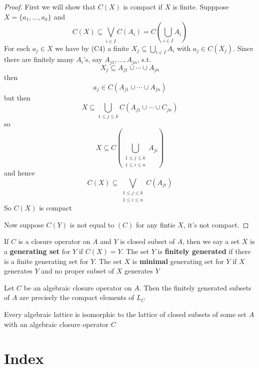 \documentclass[11pt]{article}
\begin{document}
\begin{proof}
First we will show that \(C(X)\) is compact if \(X\) is finite. Supppose 
\(X=\{a_1,\dots,a_k\}\) and
\begin{equation*}
C(X)\subseteq\displaystyle\bigvee_{i\in I}C(A_i)=C(\bigcup_{i\in I}A_i)
\end{equation*}
For each \(a_j\in X\) we have by (C4) a finite 
\(X_j\subseteq \bigcup_{i\in I}A_i\) with \(a_j\in C(X_j)\). Since there are
finitely many \(A_i\)'s, say \(A_{j1},\dots,A_{jn}\), s.t.
\begin{equation*}
X_j\subseteq A_{j1}\cup\cdots\cup A_{jn}
\end{equation*}
then
\begin{equation*}
a_j\in C(A_{j1}\cup\cdots\cup A_{jn})
\end{equation*}
but then
\begin{equation*}
X\subseteq \displaystyle\bigcup_{1\le j\le k}C(A_{j1}\cup\cdots\cup C_{jn})
\end{equation*}
so
\begin{equation*}
X\subseteq C(\displaystyle\bigcup_{\substack{1\le j\le k\\1\le i\le n}}A_{ji})
\end{equation*}
and hence
\begin{equation*}
C(X)\subseteq\displaystyle\bigvee_{\substack{1\le j\le k\\1\le i\le n}}C(A_{ji})
\end{equation*}
So \(C(X)\) is compact

Now suppose \(C(Y)\) is not equal to  \((C)\) for any fintie \(X\), it's not compact.
\end{proof}

\begin{definition}[]
If \(C\) is a closure operator on \(A\) and \(Y\) is closed subset of \(A\), then
we say a set \(X\) is a \textbf{generating set} for \(Y\) if \(C(X)=Y\). The set \(Y\) is 
\textbf{finitely generated} if there is a finite generating set for \(Y\). The set \(X\)
is \textbf{minimal} generating set for \(Y\) if \(X\) generates \(Y\) and no proper subset
of \(X\) generates \(Y\)
\end{definition}


\begin{corollary}[]
Let \(C\) be an algebraic closure operator on \(A\). Then the finitely generated
subsets of \(A\) are precisely the compact elements of \(L_C\)
\end{corollary}

\begin{theorem}[]
Every algebraic lattice is isomorphic to the lattice of closed subsets of
some set \(A\) with an algebraic closure operator \(C\)
\end{theorem}


\section{Index}
\label{sec:orgcf582db}
\renewcommand{\indexname}{}
\printindex
\end{document}

